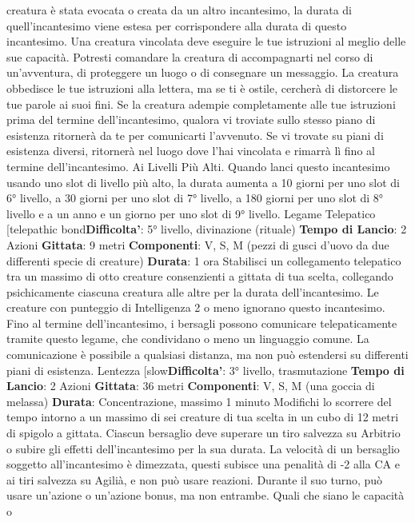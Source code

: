 \begin{multicols}{2}
creatura è stata evocata o creata da un altro
incantesimo, la durata di quell’incantesimo viene estesa
per corrispondere alla durata di questo incantesimo.
Una creatura vincolata deve eseguire le tue istruzioni al
meglio delle sue capacità. Potresti comandare la
creatura di accompagnarti nel corso di un’avventura, di
proteggere un luogo o di consegnare un messaggio. La
creatura obbedisce le tue istruzioni alla lettera, ma se ti
è ostile, cercherà di distorcere le tue parole ai suoi fini.
Se la creatura adempie completamente alle tue
istruzioni prima del termine dell’incantesimo, qualora vi
troviate sullo stesso piano di esistenza ritornerà da te
per comunicarti l’avvenuto. Se vi trovate su piani di
esistenza diversi, ritornerà nel luogo dove l’hai vincolata
e rimarrà lì fino al termine dell’incantesimo.
Ai Livelli Più Alti. Quando lanci questo incantesimo
usando uno slot di livello più alto, la durata aumenta a
10 giorni per uno slot di 6° livello, a 30 giorni per uno
slot di 7° livello, a 180 giorni per uno slot di 8° livello e a
un anno e un giorno per uno slot di 9° livello.
Legame Telepatico
[telepathic bond\textbf{Difficolta'}:
5° livello, divinazione (rituale)
\textbf{Tempo di Lancio}: 2 Azioni
\textbf{Gittata}: 9 metri
\textbf{Componenti}: V, S, M (pezzi di gusci d’uovo da due
differenti specie di creature)
\textbf{Durata}: 1 ora
Stabilisci un collegamento telepatico tra un massimo di
otto creature consenzienti a gittata di tua scelta,
collegando psichicamente ciascuna creatura alle altre
per la durata dell’incantesimo. Le creature con
punteggio di Intelligenza 2 o meno ignorano questo
incantesimo.
Fino al termine dell’incantesimo, i bersagli possono
comunicare telepaticamente tramite questo legame,
che condividano o meno un linguaggio comune. La
comunicazione è possibile a qualsiasi distanza, ma non
può estendersi su differenti piani di esistenza.
Lentezza
[slow\textbf{Difficolta'}:
3° livello, trasmutazione
\textbf{Tempo di Lancio}: 2 Azioni
\textbf{Gittata}: 36 metri
\textbf{Componenti}: V, S, M (una goccia di melassa)
\textbf{Durata}: Concentrazione, massimo 1 minuto
Modifichi lo scorrere del tempo intorno a un massimo di
sei creature di tua scelta in un cubo di 12 metri di
spigolo a gittata. Ciascun bersaglio deve superare un
tiro salvezza su Arbitrio o subire gli effetti
dell’incantesimo per la sua durata.
La velocità di un bersaglio soggetto all’incantesimo è
dimezzata, questi subisce una penalità di -2 alla CA e ai
tiri salvezza su Agilià, e non può usare reazioni.
Durante il suo turno, può usare un’azione o un’azione
bonus, ma non entrambe. Quali che siano le capacità o

\end{multicols}
